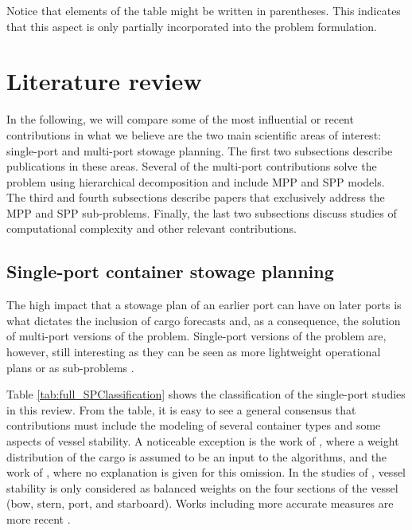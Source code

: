 \documentclass[preprint,12pt,authoryear]{elsarticle}
\begin{document}
Notice that elements of the table might be written in parentheses. This indicates that this aspect is only partially incorporated into the problem formulation.


\section{Literature review} \label{sec:contributions}
In the following, we will compare some of the most influential or recent contributions in what we believe are the two main scientific areas of interest: single-port and multi-port stowage planning. The first two subsections describe publications in these areas. Several of the multi-port contributions solve the problem using hierarchical decomposition and include MPP and SPP models. The third and fourth subsections describe papers that exclusively address the MPP and SPP sub-problems. Finally, the last two subsections discuss studies of computational complexity and other relevant contributions.       

\subsection{Single-port container stowage planning}\label{sec:solMethods1}
The high impact that a stowage plan of an earlier port can have on later ports is what dictates the inclusion of cargo forecasts and, as a consequence, the solution of multi-port versions of the problem. Single-port versions of the problem are, however, still interesting as they can be seen as more lightweight operational plans or as sub-problems \citep{Delgado2012ABays}. 

Table \ref{tab:full_SPClassification} shows the classification of the single-port studies in this review. 
From the table, it is easy to see a general consensus that contributions must include the modeling of several container types and some aspects of vessel stability. A noticeable exception is the work of \cite{Delgado2012AStowage, Shen2017AProblem}, where a weight distribution of the cargo is assumed to be an input to the algorithms, and the work of \cite{Zhao2018ContainerSearch}, where no explanation is given for this omission.
In the studies of \cite{Sciomachen2003TheProblem,Ambrosino2004StowingProblem,Ambrosino2006AProblem,Sciomachen2007AProductivity,Ambrosino2010AnProblem, Cruz-Reyes2015,Li2020OptimizingShipping}, vessel stability is only considered as balanced weights on the four sections of the vessel (bow, stern, port, and starboard). Works including more accurate measures are more recent \citep{Cho1981DevelopmentPlanning,Hu2012CombinatorialTerminal,Zhu2020IntegerProblem,Larsen2021AProblem,ElYaagoubi2022Multi-objectiveSystem}. 
\end{document}
